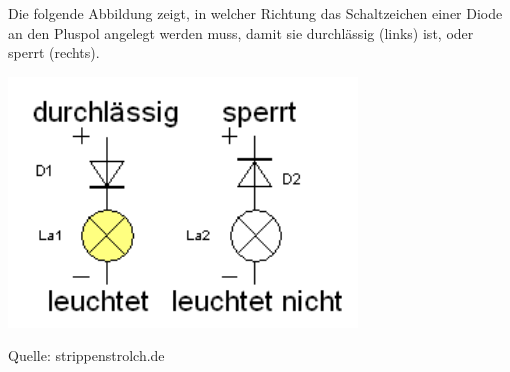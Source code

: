 \begin{sich}
Die folgende Abbildung zeigt, in welcher Richtung das Schaltzeichen einer Diode an den Pluspol angelegt werden muss, damit sie durchlässig (links) ist, oder sperrt (rechts).
\begin{center}
\includegraphics[scale=.7]{pics/diodenrichtung}

\small{Quelle: strippenstrolch.de}
\end{center}
\end{sich}



